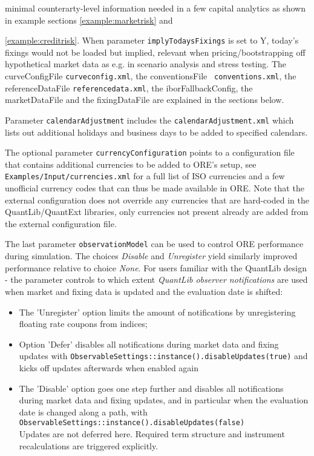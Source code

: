 minimal counterarty-level information needed in a few capital analytics as shown in example sections \ref{example:marketrisk} and {\ref{example:creditrisk}.
When parameter {\tt implyTodaysFixings} is set to Y,
today's fixings would not be loaded but implied, relevant when pricing/bootstrapping off hypothetical market data as
e.g. in scenario analysis and stress testing. The curveConfigFile {\tt curveconfig.xml}, the conventionsFile {\tt
  conventions.xml}, the referenceDataFile {\tt referencedata.xml}, the iborFallbackConfig, the marketDataFile and the
fixingDataFile are explained in the sections below.

\medskip Parameter {\tt calendarAdjustment} includes the {\tt calendarAdjustment.xml} which lists out additional holidays and
business days to be added to specified calendars.

\medskip The optional parameter {\tt currencyConfiguration} points to a configuration file that contains additional currencies
to be added to ORE's setup, see {\tt Examples/Input/currencies.xml} for a full list of ISO currencies and a few unofficial currency
codes that can thus be made available in ORE. Note that the external configuration does not override any currencies that are
hard-coded in the QuantLib/QuantExt libraries, only currencies not present already are added from the external configuration file.

\medskip The last parameter {\tt observationModel} can be used to control ORE performance during simulation. The choices
{\em Disable } and {\em Unregister } yield similarly improved performance relative to choice {\em None}. For users
familiar with the QuantLib design - the parameter controls to which extent {\em QuantLib observer notifications} are
used when market and fixing data is updated and the evaluation date is shifted:
\begin{itemize}
\item The 'Unregister' option limits the amount of notifications by unregistering floating rate coupons from indices;
\item Option 'Defer' disables all notifications during market data and fixing updates with
{\tt ObservableSettings::instance().disableUpdates(true)}
and kicks off updates afterwards when enabled again
\item The 'Disable' option goes one step further and disables all notifications during market data and fixing updates,
  and in particular when the evaluation date is changed along a path, with \\
  {\tt ObservableSettings::instance().disableUpdates(false)} \\
  Updates are not deferred here. Required term structure and instrument recalculations are triggered explicitly.
\end{itemize}

}
